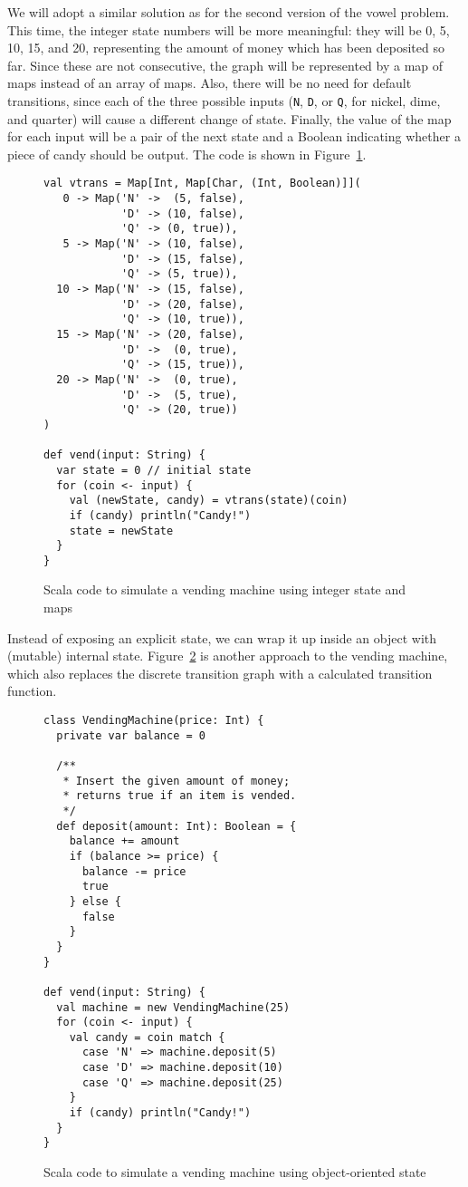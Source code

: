 We will adopt a similar solution as for the second version of the vowel problem. This
time, the integer state numbers will be more meaningful: they will be 0, 5, 10, 15,
and 20, representing the amount of money which has been deposited so far. Since these
are not consecutive, the graph will be represented by a map of maps instead of an
array of maps. Also, there will be no need for default transitions, since each of the
three possible inputs (\verb|N|, \verb|D|, or \verb|Q|, for nickel, dime, and quarter) will cause a
different change of state. Finally, the value of the map for each input will be a pair of the next state
and a Boolean indicating whether a piece of candy should be output. The code is shown in Figure~\ref{fig:vendinginteger}.
\begin{figure}
\begin{verbatim}
val vtrans = Map[Int, Map[Char, (Int, Boolean)]](
   0 -> Map('N' ->  (5, false),
            'D' -> (10, false),
            'Q' -> (0, true)),
   5 -> Map('N' -> (10, false),
            'D' -> (15, false),
            'Q' -> (5, true)),
  10 -> Map('N' -> (15, false),
            'D' -> (20, false),
            'Q' -> (10, true)),
  15 -> Map('N' -> (20, false),
            'D' ->  (0, true), 
            'Q' -> (15, true)),
  20 -> Map('N' ->  (0, true),
            'D' ->  (5, true),
            'Q' -> (20, true))
)

def vend(input: String) {
  var state = 0 // initial state
  for (coin <- input) {
    val (newState, candy) = vtrans(state)(coin)
    if (candy) println("Candy!")
    state = newState
  }
}
\end{verbatim}
\caption{Scala code to simulate a vending machine using integer state and maps}
\label{fig:vendinginteger}
\end{figure}

Instead of exposing an explicit state, we can wrap it up inside an object with
(mutable) internal state. Figure~\ref{fig:vendingobject} is another approach to the vending machine, which also
replaces the discrete transition graph with a calculated transition function.
\begin{figure}
\begin{verbatim}
class VendingMachine(price: Int) {
  private var balance = 0
  
  /**
   * Insert the given amount of money;
   * returns true if an item is vended.
   */
  def deposit(amount: Int): Boolean = {
    balance += amount
    if (balance >= price) {
      balance -= price
      true
    } else {
      false
    }
  }
}

def vend(input: String) {
  val machine = new VendingMachine(25)
  for (coin <- input) {
    val candy = coin match {
      case 'N' => machine.deposit(5)
      case 'D' => machine.deposit(10)
      case 'Q' => machine.deposit(25)
    }
    if (candy) println("Candy!")
  }
}
\end{verbatim}
\caption{Scala code to simulate a vending machine using object-oriented state}
\label{fig:vendingobject}
\end{figure}
